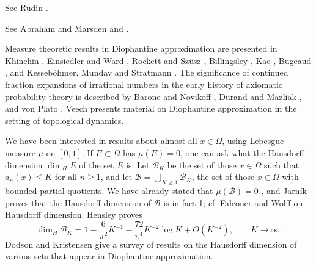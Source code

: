 \documentclass{article}
\begin{document}
See Rudin \cite{rudinfourier}.

See Abraham and Marsden \cite[p. 395, Proposition 5.2.23]{abraham} and \cite[pp. 818-820, Proposition 5.2.23]{abraham}.


 



Measure theoretic results in Diophantine approximation are presented in Khinchin \cite{MR1451873}, 
Einsiedler and Ward \cite[Chapter 3]{einsiedler},
Rockett and Sz\"usz \cite[Chapters V and VI]{rockett},   Billingsley \cite[pp.~13--15, 319--326]{billingsley},  Kac \cite[Chapter 5]{kac},  Bugeaud \cite{bugeaud}, and Kesseb\"ohmer,
Munday and Stratmann \cite{kessebohmer}.
The significance of continued fraction expansions of irrational numbers in the early history of axiomatic probability theory is described
by Barone and Novikoff \cite{barone}, Durand and Mazliak \cite{MR2859995}, and von Plato \cite{vonplato}.
Veech \cite{veech} presents material on Diophantine approximation in the setting of topological dynamics.

We have been interested in results about almost all $x \in \Omega$, using Lebesgue measure $\mu$ on $[0,1]$. If $E \subset \Omega$ has $\mu(E)=0$, one can 
ask what the Hausdorff dimension $\dim_H E$ of the set $E$ is. Let $\mathcal{B}_K$ be the set of those $x \in \Omega$ such that $a_n(x) \leq K$ for all
$n \geq 1$, and let $\mathcal{B} = \bigcup_{K \geq 1} \mathcal{B}_K$, the set of those $x \in \Omega$ with bounded partial quotients.
We have  already stated that $\mu(\mathcal{B})=0$ \cite[p.~60, Theorem 29]{MR1451873}, and Jarn\'ik  \cite[Theorem~4.3]{MR2112110} proves that
the Hausdorff dimension of $\mathcal{B}$ is in fact 1; cf. Falconer \cite[p.~155, Theorem 10.3]{falconer} and Wolff \cite[p.~67, Chapter 9]{wolff} on Hausdorff dimension.
Hensley \cite{hensley} proves 
\[
\dim_H \mathcal{B}_K = 1 - \frac{6}{\pi^2} K^{-1} - \frac{72}{\pi^4} K^{-2} \log K + O(K^{-2}),\qquad K \to \infty.
\]
Dodson and Kristensen \cite{MR2112110} give a survey of results on the Hausdorff dimension of various sets that
appear in Diophantine approximation.
\end{document}
